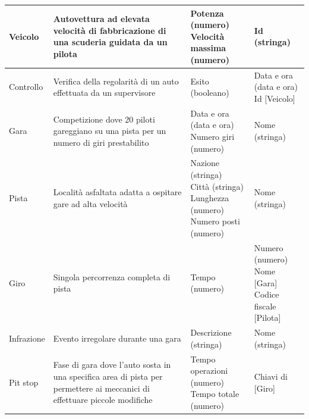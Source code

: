 \documentclass[11pt]{article}
\begin{document}
\begin{center}
{\begin{tabular}{ |l|p{5.5cm}|p{5cm}|p{4cm}| }
        \hline
        Veicolo &
        Autovettura ad elevata velocità di fabbricazione di una scuderia guidata da un pilota &
        \parbox[t]{\linewidth}{Potenza (numero)\\Velocità massima (numero)} & 
        Id (stringa) \\

        \hline
        Controllo &
        Verifica della regolarità di un auto effettuata da un supervisore & 
        \parbox[t]{\linewidth}{Esito (booleano)} & 
        \parbox[t]{\linewidth}{Data e ora (data e ora)\\Id [Veicolo] } \\

        \hline
        Gara &
        Competizione dove 20 piloti gareggiano su una pista per un numero di giri prestabilito & 
        \parbox[t]{\linewidth}{Data e ora (data e ora)\\Numero giri (numero)} & 
        Nome (stringa) \\

        \hline
        Pista &
        Località asfaltata adatta a ospitare gare ad alta velocità & 
        \parbox[t]{\linewidth}{Nazione (stringa)\\Città (stringa)\\Lunghezza (numero)\\Numero posti (numero)} & 
        Nome (stringa) \\

        \hline
        Giro &
        Singola percorrenza completa di pista & 
        \parbox[t]{\linewidth}{Tempo (numero)} & 
        \parbox[t]{\linewidth}{Numero (numero)\\Nome [Gara]\\Codice fiscale [Pilota]} \\ 

        \hline
        Infrazione &
        Evento irregolare durante una gara & 
        \parbox[t]{\linewidth}{Descrizione (stringa)} & 
        Nome (stringa) \\

        \hline
        Pit stop &
        Fase di gara dove l'auto sosta in una specifica area di pista per permettere ai meccanici di effettuare piccole modifiche & 
        \parbox[t]{\linewidth}{Tempo operazioni (numero)\\Tempo totale (numero)} & 
        Chiavi di [Giro] \\

        \hline
    \end{tabular}
}
\end{center}
\end{document}
